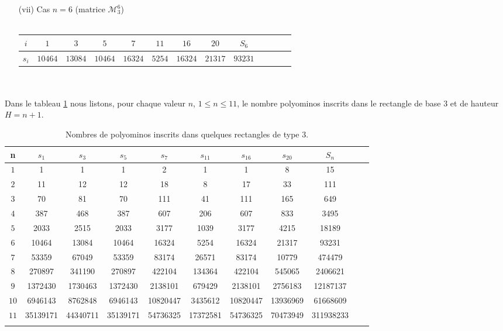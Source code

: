 \begin{itemize}
\begin{tabular}{|c|c|c|c|c|c|c|c|c|c|c|c|c|}
 \hline
 \end{tabular}
 \mbox{ }\\
\item[(vii)] Cas $n=6$ (matrice $\mathcal{M}_{3}^{6}$)\\
 \mbox{ }\\
 \begin{tabular}{|c|c|c|c|c|c|c|c|c|c|c|c|c|}
 \hline
 $i$ & $1$ & $3$ & $5$ & $7$ & $11$ & $16$ & $20$&$S_{6}$\\
 \hline
 $s_{i}$ & $10464$ & $13084$ & $10464$ & $16324$ & $5254$&$16324$&$21317$&$93231$\\
 \hline
 \end{tabular}
\end{itemize}
\mbox{}\\\mbox{}\\
Dans le tableau \ref{v3} nous listons, pour chaque valeur $n$, $1\leq n\leq 11$, le nombre  polyominos inscrits dans le rectangle de base $3$ et de hauteur $H=n+1$.
\begin{tiny}
\begin{longtable}{|c|c|c|c|c|c|c|c|c|c|c|} 
\hline
n&$s_{1}$&$s_{3}$&$s_{5}$&$s_{7}$&$s_{11}$&$s_{16}$&$s_{20}$&$S_{n}$\\
\hline
$1$& 1
 & 1
& 1 & 2
& 1
& 1
& 8& 15\\

\hline
$2$& 11
 & 12
& 12 & 18
& 8 
& 17
& 33 & 111\\

\hline
$3$& 70
 & 81
& 70 & 111
& 41
& 111
& 165 & 649\\

\hline
$4$& 387
 & 468
& 387 & 607
& 206
& 607
& 833& 3495\\

\hline
$5$& 2033
 & 2515
& 2033 & 3177
& 1039
& 3177
&4215 &18189\\
\hline
$6$& 10464
 & 13084
& 10464& 16324
& 5254
&16324 &
21317 &93231  \\
\hline
$7$&53359
 & 67049
& 53359& 83174
& 26571
&83174
 &  10779&474479\\
\hline
$8$&270897
 &341190
 &270897
 &422104
 &134364
 & 422104&545065 &2406621
\\
\hline
$9$&  1372430
&1730463
 &1372430
 & 2138101
& 679429
& 2138101
&2756183
 &12187137
\\
\hline
$10$&6946143
 &8762848
 &6946143
 & 10820447
& 3435612
&10820447 & 13936969
& 61668609\\
\hline
$11$&35139171
 &44340711
 & 35139171
 & 54736325 &  17372581
& 54736325
& 70473949 &  311938233
\\
\hline
\caption{\label{v3} Nombres de polyominos inscrits dans quelques rectangles de type $3$.}
\end{longtable}
\end{tiny}

